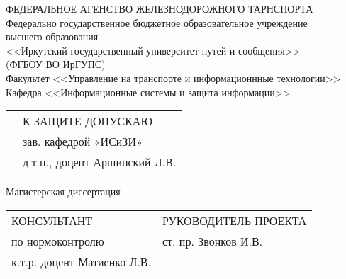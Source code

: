\begin{titlepage}
	\changefontsizes[14pt]{14pt}
	\newpage
	\begin{center}
		ФЕДЕРАЛЬНОЕ АГЕНСТВО ЖЕЛЕЗНОДОРОЖНОГО ТАРНСПОРТА \\
		\vspace{14pt}
		Федерально государственное бюджетное образовательное учреждение \\ высшего образования \\
		<<Иркутский государственный университет путей и сообщения>> \\
		(ФГБОУ ВО ИрГУПС) \\
		\vspace{21pt}
		Факультет <<Управление на транспорте и информационнные технологии>> \\
		Кафедра <<Информационные системы и защита информации>>
	\end{center}
	\vspace{28pt}
	\begin{flushleft}
		\begin{tabular}{p{}l}
								&  К ЗАЩИТЕ ДОПУСКАЮ				\\
								&  	зав. кафедрой «ИСиЗИ»			\\
								&  	д.т.н., доцент Аршинский Л.В.	\\
		\end{tabular}
	\end{flushleft}
	\vspace{28pt}
	\begin{center}
		\MakeUppercase{\kurtitle}
	\end{center}
	\vspace{-7pt}
	\begin{center}
		Магистерская диссертация \\
	\vspace{14pt}
		\mytitle
	\end{center}
	\vspace{35pt}
	\begin{flushleft}
		\begin{tabular}{p{0.47\textwidth}l}
			КОНСУЛЬТАНТ					&  РУКОВОДИТЕЛЬ ПРОЕКТА		\\
			по нормоконтролю			&  ст. пр. Звонков И.В.		\\
			к.т.р. доцент Матиенко Л.В.	&  							\\
		\end{tabular}
	\end{flushleft}
	\vspace{35pt}
	\begin{flushleft}

\end{flushleft}
\end{titlepage}
